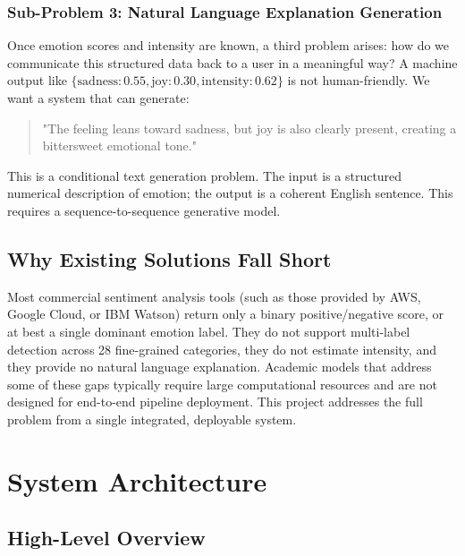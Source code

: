 \documentclass[12pt, a4paper]{report}
\begin{document}
\subsection{Sub-Problem 3: Natural Language Explanation Generation}

Once emotion scores and intensity are known, a third problem arises: how do we communicate this structured data back to a user in a meaningful way? A machine output like $\{\text{sadness}: 0.55, \text{joy}: 0.30, \text{intensity}: 0.62\}$ is not human-friendly. We want a system that can generate:

\begin{quote}
    "The feeling leans toward sadness, but joy is also clearly present, creating a bittersweet emotional tone."
\end{quote}

This is a conditional text generation problem. The input is a structured numerical description of emotion; the output is a coherent English sentence. This requires a sequence-to-sequence generative model.

\section{Why Existing Solutions Fall Short}

Most commercial sentiment analysis tools (such as those provided by AWS, Google Cloud, or IBM Watson) return only a binary positive/negative score, or at best a single dominant emotion label. They do not support multi-label detection across 28 fine-grained categories, they do not estimate intensity, and they provide no natural language explanation. Academic models that address some of these gaps typically require large computational resources and are not designed for end-to-end pipeline deployment. This project addresses the full problem from a single integrated, deployable system.

\chapter{System Architecture}

\section{High-Level Overview}
\end{document}
